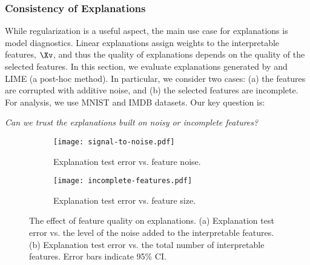 \documentclass[twoside,11pt]{article}
\begin{document}
\subsubsection{Consistency of Explanations}
\label{sec:cen-consistency}

While regularization is a useful aspect, the main use case for explanations is model diagnostics.
Linear explanations assign weights to the interpretable features, $\Xv$, and thus the quality of explanations depends on the quality of the selected features.
In this section, we evaluate explanations generated by {\CEN} and LIME (a post-hoc method).
In particular, we consider two cases: (a) the features are corrupted with additive noise, and (b) the selected features are incomplete.
For analysis, we use MNIST and IMDB datasets.
Our key question is:

\vspace{0.4ex}
\begin{blockquote}
    \centering
    \emph{Can we trust the explanations built on noisy or incomplete features?}
\end{blockquote}


\begin{figure}[h]
    \centering
    \begin{subfigure}[t]{0.48\textwidth}
        \texttt{[image: signal-to-noise.pdf]}\caption{Explanation test error vs. feature noise.}\label{fig:signal-to-noise}
    \end{subfigure}
    \quad
    \begin{subfigure}[t]{0.48\textwidth}
        \texttt{[image: incomplete-features.pdf]}\caption{Explanation test error vs. feature size.}\label{fig:incomplete-features}
    \end{subfigure}
    \caption{The effect of feature quality on explanations.
    (a) Explanation test error vs. the level of the noise added to the interpretable features.
    (b) Explanation test error vs. the total number of interpretable features.
    Error bars indicate 95\% CI.}
\end{figure}
 
\end{document}
